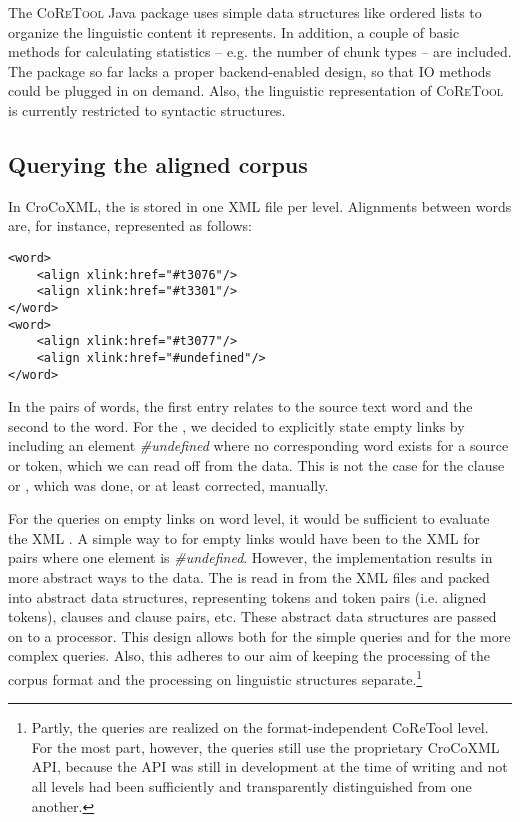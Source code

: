 \documentclass[output=paper]{LSP/langsci}
\begin{document}
The \textsc{CoReTool} Java package uses simple data structures like ordered lists to organize the linguistic content it represents. In addition, a couple of basic methods for calculating statistics -- e.g. the number of chunk types -- are included. The package so far lacks a proper backend-enabled design, so that IO methods could be plugged in on demand. Also, the linguistic representation of \textsc{CoReTool} is currently restricted to syntactic structures.

\subsection{Querying the aligned corpus}\label{sec:culo:3.3}

In CroCoXML, the  is stored in one XML file per level. Alignments between words are, for instance, represented as follows:

\ea
\begin{lstlisting}
<word>
    <align xlink:href="#t3076"/>
    <align xlink:href="#t3301"/>
</word>
<word>
    <align xlink:href="#t3077"/>
    <align xlink:href="#undefined"/>
</word> 
\end{lstlisting}
 \z


In the pairs of words, the first entry relates to the source text word and the second to the  word. For the , we decided to explicitly state empty links by including an element \textit{\#undefined} where no corresponding word exists for a source or  token, which we can read off from the  data. This is not the case for the clause or , which was done, or at least corrected, manually.

For the queries on empty links on word level, it would be sufficient to evaluate the XML . A simple way to  for empty links would have been to  the XML  for pairs where one element is \textit{\#undefined}. However, the implementation results in more abstract ways to  the data. The  is read in from the XML files and packed into abstract data structures, representing tokens and token pairs (i.e. aligned tokens), clauses and clause pairs, etc. These abstract data structures are passed on to a  processor. This design allows both for the simple  queries and for the more complex  queries. Also, this adheres to our aim of keeping the processing of the corpus format and the processing on linguistic structures separate.\footnote{Partly, the queries are realized on the format-independent CoReTool level. For the most part, however, the queries still use the proprietary CroCoXML API, because the API was still in development at the time of writing and not all levels had been sufficiently and transparently  distinguished from one another.}
\end{document}
